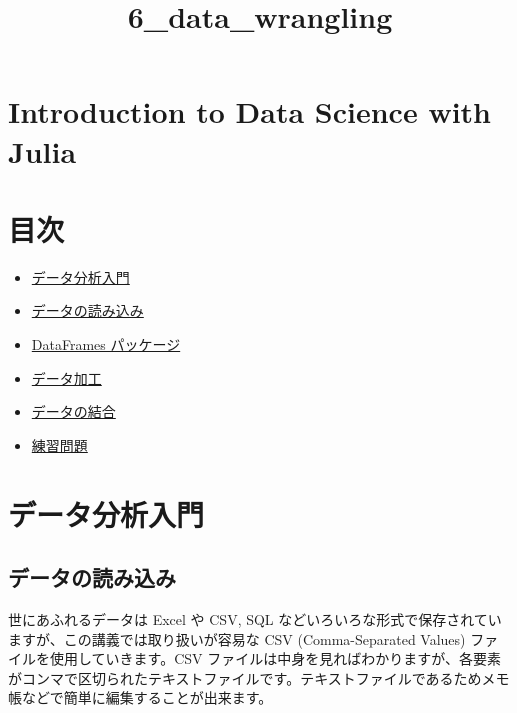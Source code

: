 \documentclass[a4paper,dvipdfmx,uplatex]{jsarticle}
\title{6\_data\_wrangling}
\providecommand{\tightlist}{%
      \setlength{\itemsep}{0pt}\setlength{\parskip}{0pt}}
\begin{document}
    
    
    \maketitle
    
    

    
    \section{Introduction to Data Science with
Julia}\label{introduction-to-data-science-with-julia}

\section{目次}\label{ux76eeux6b21}

\begin{itemize}
\tightlist
\item
  \protect\hyperlink{ux30c7ux30fcux30bfux5206ux6790ux5165ux9580}{データ分析入門}
\item
  \protect\hyperlink{ux30c7ux30fcux30bfux306eux8aadux307fux8fbcux307f}{データの読み込み}
\item
  \protect\hyperlink{DataFrames-ux30d1ux30c3ux30b1ux30fcux30b8}{DataFrames
  パッケージ}
\item
  \protect\hyperlink{ux30c7ux30fcux30bfux52a0ux5de5}{データ加工}
\item
  \protect\hyperlink{ux30c7ux30fcux30bfux306eux7d50ux5408}{データの結合}
\item
  \protect\hyperlink{ux7df4ux7fd2ux554fux984c}{練習問題}
\end{itemize}

    \section{データ分析入門}\label{ux30c7ux30fcux30bfux5206ux6790ux5165ux9580}

\subsection{データの読み込み}\label{ux30c7ux30fcux30bfux306eux8aadux307fux8fbcux307f}

世にあふれるデータは Excel や CSV, SQL
などいろいろな形式で保存されていますが、この講義では取り扱いが容易な CSV
(Comma-Separated Values) ファイルを使用していきます。CSV
ファイルは中身を見ればわかりますが、各要素がコンマで区切られたテキストファイルです。テキストファイルであるためメモ帳などで簡単に編集することが出来ます。
\end{document}
